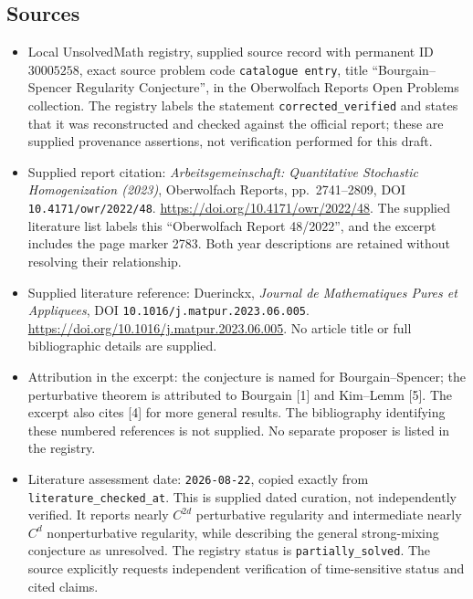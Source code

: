 \documentclass[11pt]{article}
\begin{document}
\subsection{Sources}
\begin{itemize}
\item Local UnsolvedMath registry, supplied source record with permanent ID \(30005258\), exact source problem code \texttt{catalogue entry}, title ``Bourgain--Spencer Regularity Conjecture'', in the Oberwolfach Reports Open Problems collection. The registry labels the statement \texttt{corrected\_verified} and states that it was reconstructed and checked against the official report; these are supplied provenance assertions, not verification performed for this draft.
\item Supplied report citation: \emph{Arbeitsgemeinschaft: Quantitative Stochastic Homogenization (2023)}, Oberwolfach Reports, pp.\ 2741--2809, DOI \texttt{10.4171/owr/2022/48}. \url{https://doi.org/10.4171/owr/2022/48}. The supplied literature list labels this ``Oberwolfach Report 48/2022'', and the excerpt includes the page marker 2783. Both year descriptions are retained without resolving their relationship.
\item Supplied literature reference: Duerinckx, \emph{Journal de Mathematiques Pures et Appliquees}, DOI \texttt{10.1016/j.matpur.2023.06.005}. \url{https://doi.org/10.1016/j.matpur.2023.06.005}. No article title or full bibliographic details are supplied.
\item Attribution in the excerpt: the conjecture is named for Bourgain--Spencer; the perturbative theorem is attributed to Bourgain [1] and Kim--Lemm [5]. The excerpt also cites [4] for more general results. The bibliography identifying these numbered references is not supplied. No separate proposer is listed in the registry.
\item Literature assessment date: \texttt{2026-08-22}, copied exactly from \texttt{literature\_checked\_at}. This is supplied dated curation, not independently verified. It reports nearly \(C^{2d}\) perturbative regularity and intermediate nearly \(C^d\) nonperturbative regularity, while describing the general strong-mixing conjecture as unresolved. The registry status is \texttt{partially\_solved}. The source explicitly requests independent verification of time-sensitive status and cited claims.
\end{itemize}
\end{document}
